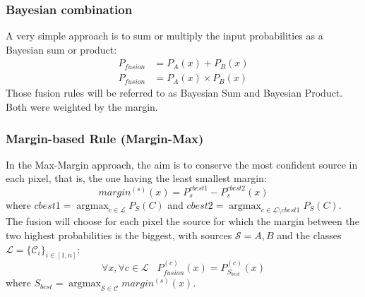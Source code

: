 \documentclass[10pt]{article}
\DeclareMathOperator{\argmax}{argmax}
\begin{document}
\subsubsection{Bayesian combination}\label{sec:bayesian}
A very simple approach is to sum or multiply the input probabilities as a Bayesian sum or product:
\begin{align}
    P_{fusion}&=P_A(x)+P_B(x)\\
    P_{fusion}&=P_A(x)\times P_B(x)
\end{align}
Those fusion rules will be referred to as Bayesian Sum and Bayesian Product. Both were weighted by the margin. %
\subsubsection{Margin-based Rule (Margin-Max)}\label{sec:margin}
In the Max-Margin approach, the aim is to conserve the most confident source in each pixel, that is, the one having the least smallest margin:
\begin{equation}
    margin^{(s)}(x)=P_s^{cbest1}-P_s^{cbest2}(x)
\end{equation}
where $cbest1=\argmax_{c\in\mathcal{L}}P_S(C)$ and $cbest2=\argmax_{c\in\mathcal{L}\setminus cbest1}P_S(C)$. The fusion will choose for each pixel the source for which the margin between the two highest probabilities is the biggest, with sources $\mathcal{S}={A,B}$ and the classes $\mathcal{L}=\{\mathcal{C}_i\}_{i\in[1,n]}$:
\begin{equation}
    \forall x,\forall c\in \mathcal{L}\;\;\; P_{fusion}^{(c)}(x)=P_{S_{best}}^{(c)}(x)
\end{equation}
where $S_{best}=\argmax_{\mathcal{S}\in\mathcal{C}}margin^{(s)}(x)$.
\end{document}
